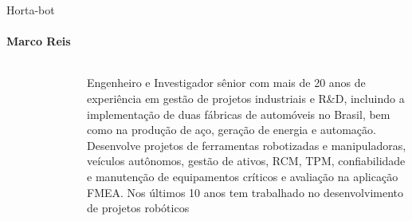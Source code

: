 \begin{frame}[t]{Horta-bot}
    \transboxout[duration=0.5]
    \framesubtitle{Marco Reis}
    \begin{columns}
            
            \begin{figure}
                \vspace*{-0.75cm}
                \hspace*{-1.5cm}
            \end{figure}
            
                \vspace*{0.1cm}
                \justifying
                
                Engenheiro e Investigador sênior com mais de 20 anos de experiência em gestão de projetos industriais e R\&D,
                incluindo a implementação de duas fábricas de automóveis no Brasil, bem como na produção de aço, geração de
                energia e automação. Desenvolve projetos de ferramentas robotizadas e manipuladoras, veículos autônomos, gestão
                de ativos, RCM, TPM, confiabilidade e manutenção de equipamentos críticos e avaliação na aplicação FMEA. 
                Nos últimos 10 anos tem trabalhado no desenvolvimento de projetos robóticos
    \end{columns}
\end{frame}

